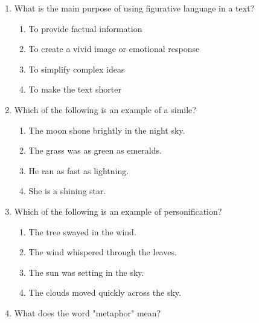 \documentclass[12pt]{article}
\begin{document}
\begin{enumerate}

    \item What is the main purpose of using figurative language in a text?

    \begin{enumerate}[label=\Alph*.]
        \item To provide factual information
        \item To create a vivid image or emotional response
        \item To simplify complex ideas
        \item To make the text shorter
    \end{enumerate}

    \vspace{0.5cm}

    \item Which of the following is an example of a simile?

    \begin{enumerate}[label=\Alph*.]
        \item The moon shone brightly in the night sky.
        \item The grass was as green as emeralds.
        \item He ran as fast as lightning.
        \item She is a shining star.
    \end{enumerate}

    \vspace{0.5cm}

    \item Which of the following is an example of personification?

    \begin{enumerate}[label=\Alph*.]
        \item The tree swayed in the wind.
        \item The wind whispered through the leaves.
        \item The sun was setting in the sky.
        \item The clouds moved quickly across the sky.
    \end{enumerate}

    \vspace{0.5cm}

    \item What does the word "metaphor" mean?


\end{enumerate}
\end{document}
